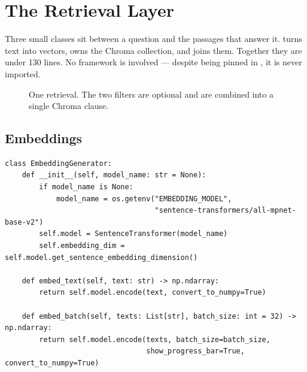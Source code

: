 \chapter{The Retrieval Layer}

Three small classes sit between a question and the passages that answer it.  turns text into vectors,  owns the Chroma collection, and  joins them. Together they are under 130 lines. No framework is involved --- despite  being pinned in , it is never imported.

\begin{figure}[H]
\centering
{}
\caption{One retrieval. The two filters are optional and are combined into a single Chroma  clause.}
\end{figure}

\section{Embeddings}

\begin{lstlisting}[style=py]
class EmbeddingGenerator:
    def __init__(self, model_name: str = None):
        if model_name is None:
            model_name = os.getenv("EMBEDDING_MODEL",
                                   "sentence-transformers/all-mpnet-base-v2")
        self.model = SentenceTransformer(model_name)
        self.embedding_dim = self.model.get_sentence_embedding_dimension()

    def embed_text(self, text: str) -> np.ndarray:
        return self.model.encode(text, convert_to_numpy=True)

    def embed_batch(self, texts: List[str], batch_size: int = 32) -> np.ndarray:
        return self.model.encode(texts, batch_size=batch_size,
                                 show_progress_bar=True, convert_to_numpy=True)
\end{lstlisting}

